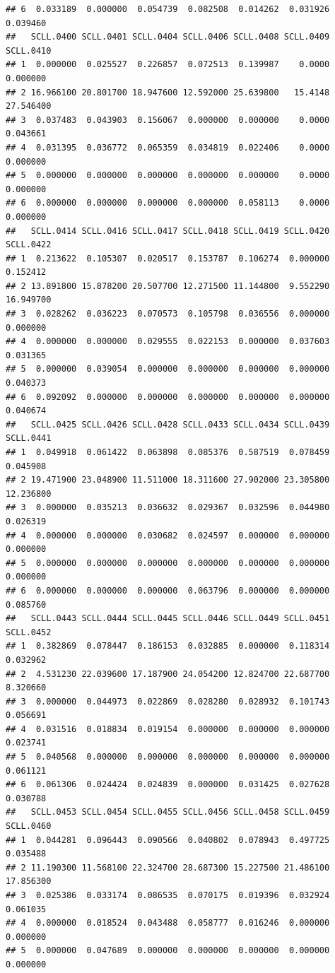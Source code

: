 \documentclass[
]{article}
\begin{document}
\begin{verbatim}
## 6  0.033189  0.000000  0.054739  0.082508  0.014262  0.031926  0.039460
##   SCLL.0400 SCLL.0401 SCLL.0404 SCLL.0406 SCLL.0408 SCLL.0409 SCLL.0410
## 1  0.000000  0.025527  0.226857  0.072513  0.139987    0.0000  0.000000
## 2 16.966100 20.801700 18.947600 12.592000 25.639800   15.4148 27.546400
## 3  0.037483  0.043903  0.156067  0.000000  0.000000    0.0000  0.043661
## 4  0.031395  0.036772  0.065359  0.034819  0.022406    0.0000  0.000000
## 5  0.000000  0.000000  0.000000  0.000000  0.000000    0.0000  0.000000
## 6  0.000000  0.000000  0.000000  0.000000  0.058113    0.0000  0.000000
##   SCLL.0414 SCLL.0416 SCLL.0417 SCLL.0418 SCLL.0419 SCLL.0420 SCLL.0422
## 1  0.213622  0.105307  0.020517  0.153787  0.106274  0.000000  0.152412
## 2 13.891800 15.878200 20.507700 12.271500 11.144800  9.552290 16.949700
## 3  0.028262  0.036223  0.070573  0.105798  0.036556  0.000000  0.000000
## 4  0.000000  0.000000  0.029555  0.022153  0.000000  0.037603  0.031365
## 5  0.000000  0.039054  0.000000  0.000000  0.000000  0.000000  0.040373
## 6  0.092092  0.000000  0.000000  0.000000  0.000000  0.000000  0.040674
##   SCLL.0425 SCLL.0426 SCLL.0428 SCLL.0433 SCLL.0434 SCLL.0439 SCLL.0441
## 1  0.049918  0.061422  0.063898  0.085376  0.587519  0.078459  0.045908
## 2 19.471900 23.048900 11.511000 18.311600 27.902000 23.305800 12.236800
## 3  0.000000  0.035213  0.036632  0.029367  0.032596  0.044980  0.026319
## 4  0.000000  0.000000  0.030682  0.024597  0.000000  0.000000  0.000000
## 5  0.000000  0.000000  0.000000  0.000000  0.000000  0.000000  0.000000
## 6  0.000000  0.000000  0.000000  0.063796  0.000000  0.000000  0.085760
##   SCLL.0443 SCLL.0444 SCLL.0445 SCLL.0446 SCLL.0449 SCLL.0451 SCLL.0452
## 1  0.382869  0.078447  0.186153  0.032885  0.000000  0.118314  0.032962
## 2  4.531230 22.039600 17.187900 24.054200 12.824700 22.687700  8.320660
## 3  0.000000  0.044973  0.022869  0.028280  0.028932  0.101743  0.056691
## 4  0.031516  0.018834  0.019154  0.000000  0.000000  0.000000  0.023741
## 5  0.040568  0.000000  0.000000  0.000000  0.000000  0.000000  0.061121
## 6  0.061306  0.024424  0.024839  0.000000  0.031425  0.027628  0.030788
##   SCLL.0453 SCLL.0454 SCLL.0455 SCLL.0456 SCLL.0458 SCLL.0459 SCLL.0460
## 1  0.044281  0.096443  0.090566  0.040802  0.078943  0.497725  0.035488
## 2 11.190300 11.568100 22.324700 28.687300 15.227500 21.486100 17.856300
## 3  0.025386  0.033174  0.086535  0.070175  0.019396  0.032924  0.061035
## 4  0.000000  0.018524  0.043488  0.058777  0.016246  0.000000  0.000000
## 5  0.000000  0.047689  0.000000  0.000000  0.000000  0.000000  0.000000

\end{verbatim}
\end{document}

